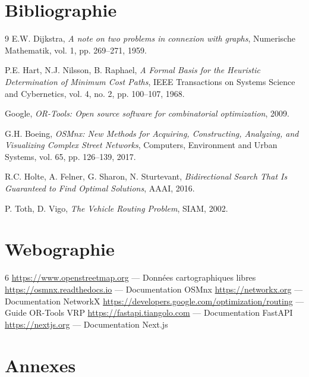 \documentclass[a4paper, 12pt, twoside]{article}
\begin{document}
\newpage
\section{Bibliographie}
\renewcommand{\bibname}{}
\renewcommand{\refname}{}
\begin{thebibliography}{9}
    E.W. Dijkstra, \textit{A note on two problems in connexion with graphs}, Numerische Mathematik, vol. 1, pp. 269--271, 1959.

    P.E. Hart, N.J. Nilsson, B. Raphael, \textit{A Formal Basis for the Heuristic Determination of Minimum Cost Paths}, IEEE Transactions on Systems Science and Cybernetics, vol. 4, no. 2, pp. 100--107, 1968.

    Google, \textit{OR-Tools: Open source software for combinatorial optimization}, 2009.

    G.H. Boeing, \textit{OSMnx: New Methods for Acquiring, Constructing, Analyzing, and Visualizing Complex Street Networks}, Computers, Environment and Urban Systems, vol. 65, pp. 126--139, 2017.

    R.C. Holte, A. Felner, G. Sharon, N. Sturtevant, \textit{Bidirectional Search That Is Guaranteed to Find Optimal Solutions}, AAAI, 2016.

    P. Toth, D. Vigo, \textit{The Vehicle Routing Problem}, SIAM, 2002.
\end{thebibliography}

\newpage
\section{Webographie}
\begin{thebibliography}{6}
   \url{https://www.openstreetmap.org} --- Donn\'{e}es cartographiques libres
   \url{https://osmnx.readthedocs.io} --- Documentation OSMnx
   \url{https://networkx.org} --- Documentation NetworkX
   \url{https://developers.google.com/optimization/routing} --- Guide OR-Tools VRP
   \url{https://fastapi.tiangolo.com} --- Documentation FastAPI
   \url{https://nextjs.org} --- Documentation Next.js
\end{thebibliography}

\newpage
\section{Annexes}
\appendix
\makeatletter
\def\@seccntformat#1{Annexe~\csname the#1\endcsname:\quad}
\makeatother
\end{document}

